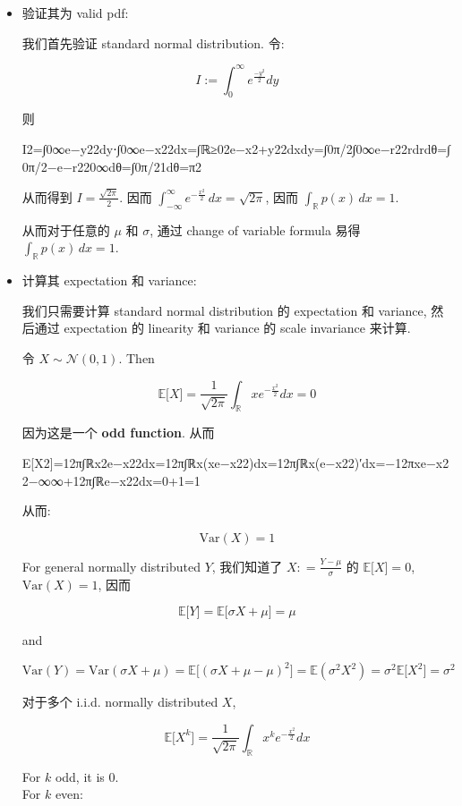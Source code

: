 \documentclass{qlnotes-export}
\begin{document}
\begin{itemize}
\item
  验证其为 valid pdf:

  我们首先验证 standard normal distribution. 令:

  \[I := \int_{0}^{\infty}e^{\frac{- y^{2}}{2}} dy\]

  则

  {I2=∫0∞e−y22dy⋅∫0∞e−x22dx=∫ℝ≥02e−x2+y22dxdy=∫0π/2∫0∞e−r22rdrdθ=∫0π/2−e−r220∞dθ=∫0π/21dθ=π2}

  从而得到 \(I = \frac{\sqrt{2\pi}}{2}\). 因而 \(\int_{- \infty}^{\infty}e^{- \frac{x^{2}}{2}}\, dx = \sqrt{2\pi}\), 因而 \(\int_{\mathbb{R}}p(x)\, dx = 1\).

  从而对于任意的 \(\mu\) 和 \(\sigma\), 通过 change of variable formula 易得 \(\int_{\mathbb{R}}p(x)\, dx = 1\).
\item
  计算其 expectation 和 variance:

  我们只需要计算 standard normal distribution 的 expectation 和 variance, 然后通过 expectation 的 linearity 和 variance 的 scale invariance 来计算.

  令 \(X \sim \mathcal{N}(0,1)\). Then

  \[{\mathbb{E}}\lbrack X\rbrack = \frac{1}{\sqrt{2\pi}}\int_{\mathbb{R}}xe^{- \frac{x^{2}}{2}} dx = 0\]

  因为这是一个 \textbf{odd function}. 从而

  {E{[}X2{]}=12π∫ℝx2e−x22dx=12π∫ℝx(xe−x22)dx=12π∫ℝx(e−x22)′dx=−12πxe−x22−∞∞+12π∫ℝe−x22dx=0+1=1}

  从而:

  \[\text{Var}(X) = 1\]

  For general normally distributed \(Y\), 我们知道了 \(X: = \frac{Y - \mu}{\sigma}\) 的 \({\mathbb{E}}\lbrack X\rbrack = 0\), \(\text{Var}(X) = 1\), 因而

  \[{\mathbb{E}}\lbrack Y\rbrack = {\mathbb{E}}\lbrack\sigma X + \mu\rbrack = \mu\]

  and

  \[\text{Var}(Y) = \text{Var}(\sigma X + \mu) = {\mathbb{E}}\lbrack(\sigma X + \mu - \mu)^{2}\rbrack = {\mathbb{E}}(\sigma^{2}X^{2}) = \sigma^{2}{\mathbb{E}}\lbrack X^{2}\rbrack = \sigma^{2}\]

  对于多个 i.i.d. normally distributed \(X\),

  \[{\mathbb{E}}\lbrack X^{k}\rbrack = \frac{1}{\sqrt{2\pi}}\int_{\mathbb{R}}x^{k}e^{- \frac{x^{2}}{2}} dx\]

  For \(k\) odd, it is \(0\).\\
  For \(k\) even:


\end{itemize}
\end{document}
